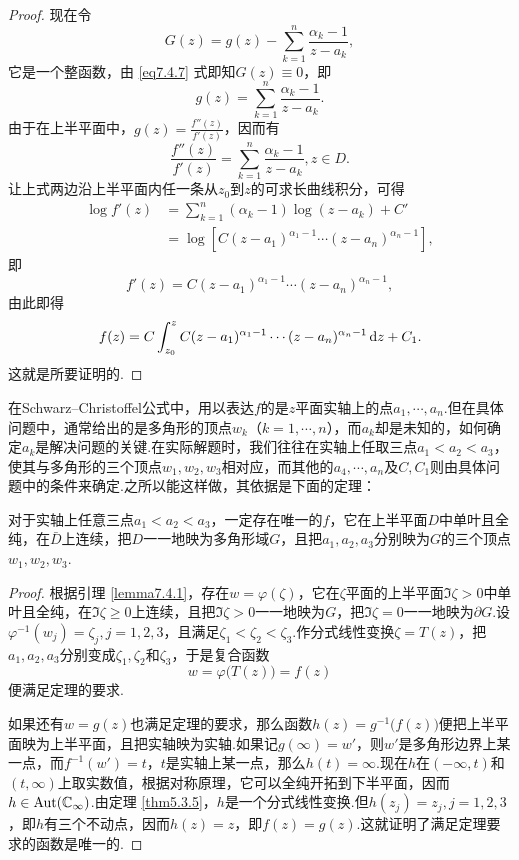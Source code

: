 \begin{proof}
  现在令
  \[
    G(z) = g(z) - \sum_{k=1}^n\frac{\alpha_k-1}{z-a_k},
  \]
  它是一个整函数，由 \eqref{eq7.4.7} 式即知$G(z)\equiv0$，即
  \[
    g(z) = \sum_{k=1}^n\frac{\alpha_k-1}{z-a_k}.
  \]
  由于在上半平面中，$g(z)=\frac{f''(z)}{f'(z)}$，因而有
  \[
    \frac{f''(z)}{f'(z)} = \sum_{k=1}^n\frac{\alpha_k-1}{z-a_k},z\in D.
  \]
  让上式两边沿上半平面内任一条从$z_0$到$z$的可求长曲线积分，可得
  \begin{align*}
    \log f'(z) & = \sum_{k=1}^n(\alpha_k-1)\log(z-a_k)+C'\\
    & = \log[C(z-a_1)^{\alpha_1-1}\cdots(z-a_n)^{\alpha_n-1}],
  \end{align*}
  即
  \[
    f'(z) = C(z-a_1)^{\alpha_1-1}\cdots(z-a_n)^{\alpha_n-1},
  \]
  由此即得
  \[
    f(z) = C\int_{z_0}^zC(z-a_1)^{\alpha_1-1}\cdots(z-a_n)^{\alpha_n-1}\mathop{}\!\mathrm dz + C_1.
  \]
  这就是所要证明的.
\end{proof}

在Schwarz--Christoffel公式中，用以表达$f$的是$z$平面实轴上的点$a_1,\cdots,a_n$.但在具体问题中，通常给出的是多角形的顶点$w_k$（$k=1,\cdots,n$），而$a_k$却是未知的，如何确定$a_k$是解决问题的关键.在实际解题时，我们往往在实轴上任取三点$a_1<a_2<a_3$，使其与多角形的三个顶点$w_1,w_2,w_3$相对应，而其他的$a_4,\cdots,a_n$及$C,C_1$则由具体问题中的条件来确定.之所以能这样做，其依据是下面的定理：

\begin{theorem}\label{thm7.4.4}
   对于实轴上任意三点$a_1<a_2<a_3$，一定存在唯一的$f$，它在上半平面$D$中单叶且全纯，在$\bar D$上连续，把$D$一一地映为多角形域$G$，且把$a_1,a_2,a_3$分别映为$G$的三个顶点$w_1,w_2,w_3$.
\end{theorem}
\begin{proof}
  根据引理 \ref{lemma7.4.1}，存在$w=\varphi(\zeta)$，它在$\zeta$平面的上半平面$\Im\zeta>0$中单叶且全纯，在$\Im\zeta\ge0$上连续，且把$\Im\zeta>0$一一地映为$G$，把$\Im\zeta=0$一一地映为$\partial G$.设$\varphi^{-1}(w_j)=\zeta_j,j=1,2,3$，且满足$\zeta_1<\zeta_2<\zeta_3$.作分式线性变换$\zeta=T(z)$，把$a_1,a_2,a_3$分别变成$\zeta_1,\zeta_2$和$\zeta_3$，于是复合函数
  \[
    w = \varphi\big( T(z) \big) = f(z)
  \]
  便满足定理的要求.

  如果还有$w=g(z)$也满足定理的要求，那么函数$h(z)=g^{-1}\big(f(z)\big)$便把上半平面映为上半平面，且把实轴映为实轴.如果记$g(\infty)=w'$，则$w'$是多角形边界上某一点，而$f^{-1}(w')=t$，$t$是实轴上某一点，那么$h(t)=\infty$.现在$h$在$(-\infty,t)$和$(t,\infty)$上取实数值，根据对称原理，它可以全纯开拓到下半平面，因而$h\in\operatorname{Aut}(\mathbb C_\infty)$.由定理 \ref{thm5.3.5}，$h$是一个分式线性变换.但$h(z_j)=z_j,j=1,2,3$，即$h$有三个不动点，因而$h(z)=z$，即$f(z)=g(z)$.这就证明了满足定理要求的函数是唯一的.
\end{proof}

